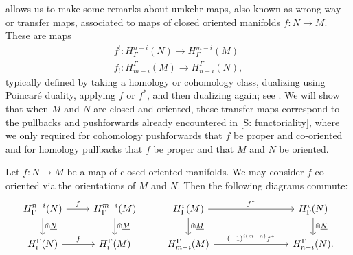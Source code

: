  allows us to make some remarks about umkehr maps, also known as wrong-way or transfer maps, associated to maps of closed oriented manifolds $f \colon N \to M$.
These are maps
\begin{align*}
	f^! \colon H^{n-i}_\Gamma(N) \to H^{m-i}_\Gamma(M)\\
	f_! \colon H_{m-i}^\Gamma(M) \to H_{n-i}^\Gamma(N),
\end{align*}
typically defined by taking a homology or cohomology class, dualizing using Poincar\'e duality, applying $f$ or $f^*$, and then dualizing again; see \cite[Definition VI.11.2]{Bred97}.
We will show that when $M$ and $N$ are closed and oriented, these transfer maps correspond to the pullbacks and pushforwards already encountered in \cref{S: functoriality}, where we only required for cohomology pushforwards that $f$ be proper and co-oriented and for homology pullbacks that $f$ be proper and that $M$ and $N$ be oriented.


\begin{proposition}
	Let $f \colon N \to M$ be a map of closed oriented manifolds.
	We may consider $f$ co-oriented via the orientations of $M$ and $N$.
	Then the following diagrams commute:
	\[
	\begin{tikzcd}
		H^{n-i}_\Gamma(N) \arrow{r}{f} \arrow[d, "\nplus \uN"] & H^{m-i}_\Gamma(M) \arrow[d, "\nplus \uM"] & H^{i}_\Gamma(M) \arrow{r}{f^*} \arrow[d, "\nplus \uM"] &[.75in] H^{i}_\Gamma(N) \arrow[d, "\nplus \uN"] \\
		H_i^\Gamma(N) \arrow{r}{f} & H_i^\Gamma(M) & H_{m-i}^\Gamma(M) \arrow[r,"(-1)^{i(m-n)}f^*"] & H_{n-i}^\Gamma(N).
	\end{tikzcd}
	\]
\end{proposition}

